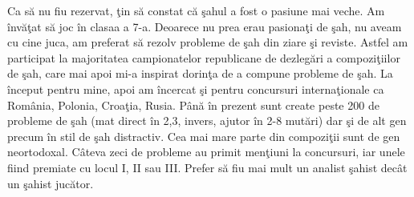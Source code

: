 Ca s\u{a} nu fiu rezervat, \c{t}in s\u{a} constat c\u{a} \c{s}ahul a fost o pasiune mai veche. Am \^{i}nv\u{a}\c{t}at s\u{a} joc \^{i}n clasaa a 7-a. Deoarece nu prea erau pasiona\c{t}i de \c{s}ah, nu aveam cu cine juca, am preferat s\u{a} rezolv probleme de \c{s}ah din ziare \c{s}i reviste. Astfel am participat la majoritatea campionatelor republicane de dezleg\u{a}ri a compozi\c{t}iilor de \c{s}ah, care mai apoi mi-a inspirat dorin\c{t}a de a compune probleme de \c{s}ah. La \^{i}nceput pentru mine, apoi am \^{i}ncercat \c{s}i pentru concursuri interna\c{t}ionale ca Rom\^{a}nia, Polonia, Croa\c{t}ia, Rusia. P\^{a}n\u{a} \^{i}n prezent sunt create peste 200 de probleme de \c{s}ah (mat direct \^{i}n 2,3, invers, ajutor \^{i}n 2-8 mut\u{a}ri) dar \c{s}i de alt gen precum \^{i}n stil de \c{s}ah distractiv. Cea mai mare parte din compozi\c{t}ii sunt de gen neortodoxal. C\^{a}teva zeci de probleme au primit men\c{t}iuni la concursuri, iar unele fiind premiate cu locul I, II sau III. Prefer s\u{a} fiu mai mult un analist \c{s}ahist dec\^{a}t un \c{s}ahist juc\u{a}tor.

\clearpage